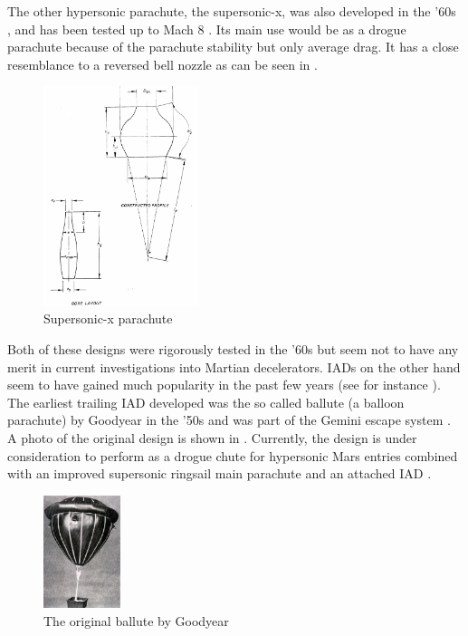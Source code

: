 The other hypersonic parachute, the supersonic-x, was also developed in the '60s \cite{galigher1969}, and has been tested up to Mach 8 \cite{ewing1978}. Its main use would be as a drogue parachute because of the parachute stability but only average drag. It has a close resemblance to a reversed bell nozzle as can be seen in . 

\begin{figure}[!ht]
\centering
\includegraphics[width=0.4\textwidth]{figures/entry_descent/supersonicx_ewing1978.jpg}
\caption{Supersonic-x parachute \cite{ewing1978}}
\label{fig:supersonicx_ewing1978}
\end{figure}  

Both of these designs were rigorously tested in the '60s but seem not to have any merit in current investigations into Martian decelerators. \acs{IAD}s on the other hand seem to have gained much popularity in the past few years (see for instance \cite{mooij2013para,gallon2013,sostaric2010,nasafacts2013,clark2009,steinfeldt2006,witkowski2006}). 
The earliest trailing \acs{IAD} developed was the so called ballute (a balloon parachute) by Goodyear in the '50s and was part of the Gemini escape system \cite{mooij2013para}. A photo of the original design is shown in . Currently, the design is under consideration to perform as a drogue chute for hypersonic Mars entries combined with an improved supersonic ringsail main parachute and an attached \acs{IAD} \cite{gallon2013}. 

\begin{figure}[!ht]
\centering
\includegraphics[width=0.2\textwidth]{figures/entry_descent/ballute_mooij2013para.jpg}
\caption{The original ballute by Goodyear \cite{mooij2013para}}
\label{fig:ballute_mooij2013para}
\end{figure} 

